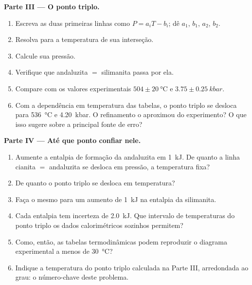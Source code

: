 \begin{problem}
\noindent\textbf{Parte III --- O ponto triplo.}
\begin{enumerate}[resume]
\item Escreva as duas primeiras linhas como $P = a_i T - b_i$; dê $a_1$, $b_1$, $a_2$, $b_2$.
\item Resolva para a temperatura de sua interseção.
\item Calcule sua pressão.
\item Verifique que andaluzita $=$ silimanita passa por ela.
\item Compare com os valores experimentais $504 \pm \qty{20}{\celsius}$ e $3.75 \pm
\qty{0.25}{kbar}$.
\item Com a dependência em temperatura das tabelas, o ponto triplo se desloca para
\qty{536}{\celsius} e \qty{4.20}{kbar}. O refinamento o aproximou do
experimento? O que isso sugere sobre a principal fonte de erro?
\end{enumerate}

\noindent\textbf{Parte IV --- Até que ponto confiar nele.}
\begin{enumerate}[resume]
\item Aumente a entalpia de formação da andaluzita em \qty{1}{kJ}. De quanto
a linha cianita $=$ andaluzita se desloca em pressão, a temperatura fixa?
\item De quanto o ponto triplo se desloca em temperatura?
\item Faça o mesmo para um aumento de \qty{1}{kJ} na entalpia da silimanita.
\item Cada entalpia tem incerteza de \qty{2.0}{kJ}. Que intervalo de temperaturas do ponto
triplo os dados calorimétricos sozinhos permitem?
\item Como, então, as tabelas termodinâmicas podem reproduzir o diagrama experimental a menos de
\qty{30}{\celsius}?
\item Indique a temperatura do ponto triplo calculada na Parte III, arredondada ao
grau: o número-chave deste problema.
\end{enumerate}
\end{problem}
